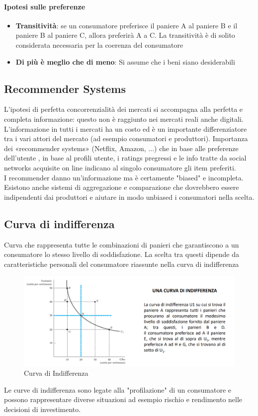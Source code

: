\documentclass[12pt]{article}
\begin{document}
\paragraph{Ipotesi sulle preferenze}
\begin{itemize}
    \item \textbf{Transitività}: se un consumatore preferisce il paniere A al paniere B e il paniere B al paniere C, allora preferirà A a C. La transitività è di solito considerata necessaria per la coerenza del consumatore
    \item \textbf{Di più è meglio che di meno}: Si assume che i beni siano desiderabili
\end{itemize}
\subsection{Recommender Systems}
L’ipotesi di perfetta concorrenzialità dei mercati si accompagna alla perfetta e completa informazione: questo non è raggiunto nei mercati reali anche digitali. \\
L’informazione in tutti i mercati ha un costo ed è un importante differenziatore tra i vari attori del mercato (ad esempio consumatori e produttori).
Importanza dei «recommender systems» (Netflix, Amazon, ...) che in base alle preferenze dell’utente , in base al profili utente, i ratings pregressi e le info tratte da social networks acquisite on line indicano al singolo consumatore gli item preferiti.\\
I recommender danno un’informazione ma è certamente "biased" e incompleta.
Esistono anche sistemi di aggregazione e comparazione che dovrebbero essere
indipendenti dai produttori e aiutare in modo unbiased i consumatori nella scelta.
\subsection{Curva di indifferenza}
Curva che rappresenta tutte le combinazioni di panieri che garantiscono a un consumatore lo stesso livello di soddisfazione. La scelta tra questi dipende da caratteristiche personali del consumatore riassunte nella curva di indifferenza
\FloatBarrier
\begin{figure}[!htb]
    \centering
    \includegraphics[width=1\textwidth]{images/curvaInd.png}
    \caption{Curva di Indifferenza}
\end{figure}
Le curve di indifferenza sono legate alla "profilazione" di un consumatore e possono rappresentare diverse situazioni ad esempio rischio e rendimento nelle decisioni di investimento.
\end{document}
